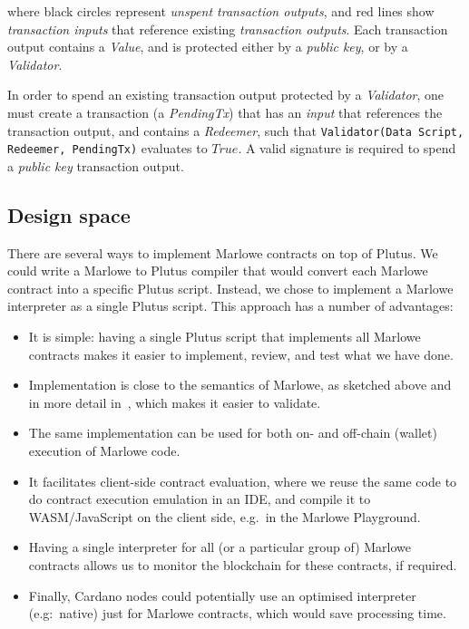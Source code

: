 \documentclass[runningheads]{llncs}
\begin{document}
\noindent
where black circles represent \emph{unspent transaction outputs}, and red lines show \emph{transaction inputs}
that reference existing \emph{transaction outputs}.
Each transaction output contains a \emph{Value}, and is protected either by a \emph{public key},
or by a \emph{Validator}.

In order to spend an existing transaction output protected by a \emph{Validator},
one must create a transaction (a \emph{PendingTx}) that has an \emph{input} that references the transaction output,
and contains a \emph{Redeemer}, such that \texttt{Validator(Data Script, Redeemer, PendingTx)} evaluates to $True$.
A valid signature is required to spend a \emph{public key} transaction output.


\subsection{Design space}

There are several ways to implement Marlowe contracts on top of Plutus.
We could write a Marlowe to Plutus compiler that would convert
each Marlowe contract into a specific Plutus script.
Instead, we chose to implement a Marlowe interpreter as a single Plutus script.
This approach has a number of advantages:
\begin{itemize}
\item It is simple: having a single Plutus script that implements all Marlowe contracts
makes it easier to implement, review, and test what we have done.
\item Implementation is close to the semantics of Marlowe, as sketched above and in more detail in~\cite{isola-marlowe},
which makes it easier to validate.
\item The same implementation can be used for both on- and off-chain (wallet) execution of Marlowe code.
\item It facilitates client-side contract evaluation, where we reuse the same code
to do contract execution emulation in an IDE, and compile it to WASM/JavaScript on the client side,
e.g.\ in the Marlowe Playground.
\item Having a single interpreter for all (or a particular group of) Marlowe contracts allows us
  to monitor the blockchain for these contracts, if required.
\item Finally, Cardano nodes could potentially use an optimised interpreter (e.g:~native) just for Marlowe contracts, which would save processing time.
\end{itemize}
\end{document}
